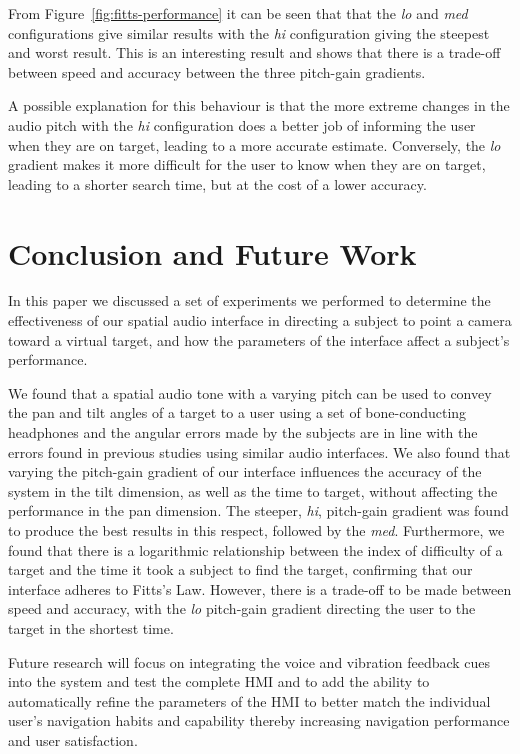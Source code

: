 \documentclass[format=sigconf, review=true, screen=true, anonymous=true]{acmart}
\begin{document}
From Figure~\ref{fig:fitts-performance} it can be seen that that the \emph{lo} and \emph{med} configurations give similar results with the \emph{hi} configuration giving the steepest and worst result. This is an interesting result and shows that there is a trade-off between speed and accuracy between the three pitch-gain gradients. 

A possible explanation for this behaviour is that the more extreme changes in the audio pitch with the \emph{hi} configuration does a better job of informing the user when they are on target, leading to a more accurate estimate. Conversely, the \emph{lo} gradient makes it more difficult for the user to know when they are on target, leading to a shorter search time, but at the cost of a lower accuracy. 

\section{Conclusion and Future Work}
\label{sec:conclusion}

In this paper we discussed a set of experiments we performed to determine the effectiveness of our spatial audio interface in directing a subject to point a camera toward a virtual target, and how the parameters of the interface affect a subject's performance. 

We found that a spatial audio tone with a varying pitch can be used to convey the pan and tilt angles of a target to a user using a set of bone-conducting headphones and the angular errors made by the subjects are in line with the errors found in previous studies using similar audio interfaces. We also found that varying the pitch-gain gradient of our interface influences the accuracy of the system in the tilt dimension, as well as the time to target, without affecting the performance in the pan dimension. The steeper, \emph{hi}, pitch-gain gradient was found to produce the best results in this respect, followed by the \emph{med}. Furthermore, we found that there is a logarithmic relationship between the index of difficulty of a target and the time it took a subject to find the target, confirming that our interface adheres to Fitts's Law. However, there is a trade-off to be made between speed and accuracy, with the \emph{lo} pitch-gain gradient directing the user to the target in the shortest time. 

Future research will focus on integrating the voice and vibration feedback cues into the system and test the complete HMI and to add the ability to automatically refine the parameters of the HMI to better match the individual user's navigation habits and capability thereby increasing navigation performance and user satisfaction.
\end{document}

